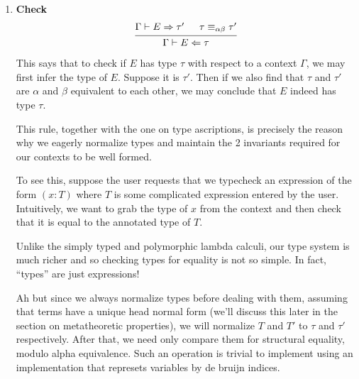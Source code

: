 \documentclass{article}
\begin{document}
\begin{definition} 
\begin{enumerate}
    \[
      \begin{prooftree}
        \hypo{\Gamma \vdash E \Leftarrow \Kind}
        \infer1{\Gamma \vdash (E : \Kind) \Rightarrow \Kind}
      \end{prooftree}
    \]
    Note that the first rule doesn't allow users to assert that $(E : \Kind)$
    since there is no $s$ with $\Gamma \vdash \Kind \Rightarrow s$.
    This second rule allows users to assert that \verb|Type| and type constructors
    have type \verb|Kind|.
    
  \item \textbf{Check} \\
    \[
      \begin{prooftree}
        \hypo{\Gamma \vdash E \Rightarrow \tau'}
        \hypo{\tau \equiv_{\alpha \beta} \tau'}
        \infer2{\Gamma \vdash E \Leftarrow \tau}
      \end{prooftree}
    \]

    This says that to check if $E$ has type $\tau$ with respect to a context
    $\Gamma$, we may first infer the type of $E$. Suppose it is $\tau'$. Then
    if we also find that $\tau$ and $\tau'$ are $\alpha$ and $\beta$ equivalent
    to each other, we may conclude that $E$ indeed has type $\tau$.

    \begin{remark}
      This rule, together with the one on type ascriptions, is precisely the reason
      why we eagerly normalize types and maintain the 2 invariants required
      for our contexts to be well formed.

      To see this, suppose the user requests that we typecheck an expression
      of the form $(x : T)$
      where $T$ is some complicated expression entered by the user.
      Intuitively, we want to grab the type of $x$ from the context and then
      check that it is equal to the annotated type of $T$.

      Unlike the simply typed and polymorphic lambda calculi, our type system is
      much richer and so checking types for equality is not so simple.
      In fact, ``types'' are just expressions!

      Ah but since we always normalize types before dealing with them, assuming
      that terms have a unique head normal form 
      (we'll discuss this later in the section on metatheoretic properties), we 
      will normalize $T$ and $T'$ to $\tau$ and $\tau'$ respectively.
      After that, we need only compare them for structural equality,
      modulo alpha equivalence. Such an operation is trivial to implement using
      an implementation that represets variables by de bruijn indices.
    \end{remark}


\end{enumerate}
\end{definition}
\end{document}
